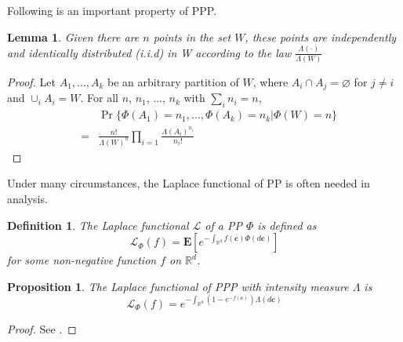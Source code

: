 \documentclass[a4paper,twocolumn]{IEEEtran}
\newtheorem{definition}{\textbf{Definition}}
\newtheorem{proposition}{\textbf{Proposition}}
\newtheorem{lemma}{\textbf{Lemma}}
\begin{document}
Following is an important property of PPP.
\begin{lemma}
	Given there are $n$ points in the set $W$, these points are independently and identically distributed (i.i.d) in W according to the law $\frac{\Lambda(\cdot)}{\Lambda(W)}$
\end{lemma}
\begin{proof}
	Let $A_1, ..., A_k$ be an arbitrary partition of $W$, where $A_i \cap A_j = \varnothing$ for $j \neq i$ and $\cup_i A_i = W$. For all $n$, $n_1$, ..., $n_k$ with $\sum_i n_i = n$,
	\begin{eqnarray}
	&&\Pr\{\Phi(A_1) = n_1, ..., \Phi(A_k) = n_k | \Phi(W) = n\}\nonumber\\
	&=&\frac{n!}{\Lambda(W)^n}\prod_{i=1}\frac{\Lambda(A_i)^{n_i}}{n_i!}\nonumber
	\end{eqnarray}
\end{proof}

Under many circumstances, the Laplace functional of PP is often needed in analysis.
\begin{definition}
The Laplace functional $\mathcal{L}$ of a PP $\Phi$ is defined as
\begin{displaymath}
\mathcal{L}_{\Phi}(f) = \mathbf{E}\left[ e^{-\int_{\mathbb{R}^d} f(\bm{c}) \Phi(d \bm{c})}\right]
\end{displaymath}
for some non-negative function $f$ on $\mathbb{R}^d$.
\end{definition}
\begin{proposition}\label{Proposition:LaplacePPP}
The Laplace functional of PPP with intensity measure $\Lambda$ is
\begin{equation}
\mathcal{L}_{\Phi}(f) = e^{-\int_{\mathbb{R}^d}(1-e^{-f(\bm{c})})\Lambda(d \bm{c})}
\end{equation}
\end{proposition}
\begin{proof}
See \cite[Proposition 1.2.2]{Baccelli2009Vol1}.
\end{proof}
\end{document}
